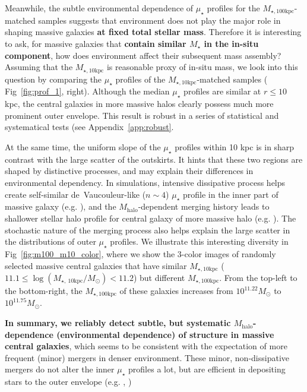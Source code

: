 \documentclass[a4paper,fleqn,usenatbib]{mnras}
\def\mstar{{$M_{\star}$}}
\def\mhalo{{$M_{\mathrm{halo}}$}}
\def\minn{{$M_{\star,10\mathrm{kpc}}$}}
\def\mtot{{$M_{\star,100\mathrm{kpc}}$}}
\def\mden{{$\mu_{\star}$}}
\begin{document}
    Meanwhile, the subtle environmental dependence of \mden{} profiles for the 
    \mtot{}-matched samples suggests that environment does not play the major role in 
    shaping massive galaxies \textbf{at fixed total stellar mass}.
    Therefore it is interesting to ask, for massive galaxies that \textbf{contain 
    similar \mstar{} in the in-situ component}, how does environment affect their 
    subsequent mass assembly?
    Assuming that the \minn{} is reasonable proxy of in-situ mass, we look into this 
    question by comparing the \mden{} profiles of the \minn{}-matched samples ( 
    Fig~\ref{fig:prof_1}, right).  
    Although the median \mden{} profiles are similar at $r \leq 10$ kpc, the
    central galaxies in more massive halos clearly possess much more prominent outer
    envelope. 
    This result is robust in a series of statistical and systematical tests 
    (see Appendix~\ref{app:robust}.
    
    At the same time, the uniform slope of the \mden{} profiles within 
    10 kpc is in sharp contrast with the large scatter of the outskirts. 
    It hints that these two regions are shaped by distinctive processes, and may 
    explain their differences in environmental dependency. 
    In simulations, intensive dissipative process helps create 
    self-similar de~Vaucouleur-like ($n{\sim} 4$) \mden{} profile in the inner part 
    of massive galaxy (e.g. \citealt{Hopkins2008}), and the \mhalo{}-dependent
    merging history leads to shallower stellar halo profile for central galaxy 
    of more massive halo (e.g. \citealt{Pillepich2014}). 
    The stochastic nature of the merging process also helps explain the 
    large scatter in the distributions of outer \mden{} profiles. 
    We illustrate this interesting diversity in Fig~\ref{fig:m100_m10_color}, where 
    we show the 3-color images of randomly selected massive central galaxies that 
    have similar \minn{} 
    ($11.1 \leq \log (M_{\star,\ 10\mathrm{kpc}}/M_{\odot}) < 11.2$)
    but different \mtot{}.   
    From the top-left to the bottom-right, the \mtot{} of these galaxies increases
    from $10^{11.22} M_{\odot}$ to $10^{11.75} M_{\odot}$.

    \textbf{In summary, we reliably detect subtle, but systematic \mhalo{}-dependence 
    (environmental dependence) of structure in massive central galaxies}, which seems 
    to be consistent with the expectation of more frequent (minor) mergers in denser 
    environment. 
    These minor, non-dissipative mergers do not alter the inner \mden{} profiles 
    a lot, but are efficient in depositing stars to the outer envelope
    (e.g. \citealt{Hilz2013}, \citealt{Oogi2013})      
      
\end{document}
